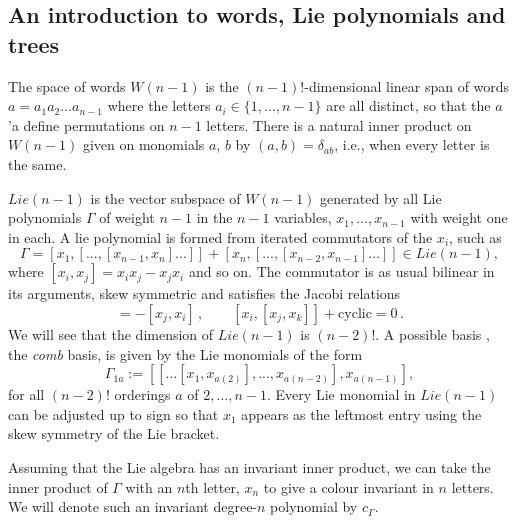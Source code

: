 \documentclass[11pt]{article}
\newcommand{\1}{{\rm 1\hskip-0.25em I}}
\begin{document}
\subsection{An introduction to words, Lie polynomials and trees}

The space of words $W(n-1)$ is the $(n-1)!$-dimensional linear span of  words $a=a_1a_2\ldots a_{n-1}$ where the letters $a_i\in \{1,\ldots,n-1\}$ are all distinct, so that the $a$'a define permutations on $n-1$ letters.  There is a natural inner product on $W(n-1)$ given  on monomials $a$, $b$ by $(a,b)=\delta_{ab}$, i.e., when every letter is the same. 



$Lie(n-1)$ is the vector subspace of $W(n-1)$  generated by all Lie polynomials $\Gamma$ of weight $n-1$ in the $n-1$ variables, $x_1, ... , x_{n-1}$ with weight one in each.  A lie polynomial is formed from iterated commutators of the $x_i$, such as
$$
\Gamma=[x_1,[...,[x_{n-1},x_n]...]] + [x_n,[...,[x_{n-2},x_{n-1}]...]] \in Lie(n-1),
$$
where $[x_i,x_j]=x_ix_j-x_jx_i$ and so on.
 The commutator  is as usual bilinear in its arguments, skew symmetric and satisfies the Jacobi relations
\begin{equation}
[x_i,x_j]=-[x_j,x_i]\, , \qquad [x_i,[x_j,x_k]]+ \mbox {cyclic}=0\, .
\end{equation}
We will see that the dimension of $Lie(n-1)$ is $(n-2)!$.  A possible basis%
, the \emph{comb} basis, is given by the Lie monomials of the form
\begin{equation}
\Gamma_{1a}:=[[\ldots [x_{1},x_{a(2)}],...,x_{a(n-2)}],x_{a(n-1)}], \label{comb}
\end{equation}
for all $(n-2)!$ orderings $a$ of $2,\ldots,n-1$. Every Lie monomial in $Lie(n-1)$ can be adjusted up to sign so that $x_1$ appears as the leftmost entry using the skew symmetry of the Lie bracket.


Assuming that the Lie algebra has an invariant inner product, we can take the inner product of $\Gamma$ with an $n$th letter, $x_n$ to give a colour invariant in $n$ letters. 
 We will denote such an invariant degree-$n$ polynomial by $c_\Gamma$.
\end{document}
